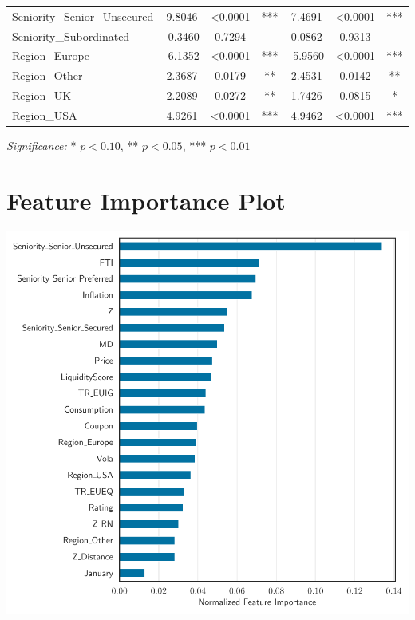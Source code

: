 \begin{center}
\begin{minipage}{\textwidth}
\begin{tabular}{lcccccc}
    Seniority\_Senior\_Unsecured & 9.8046 & <0.0001 & *** & 7.4691 & <0.0001 & *** \\
    Seniority\_Subordinated & -0.3460 & 0.7294 &  & 0.0862 & 0.9313 &  \\
    Region\_Europe & -6.1352 & <0.0001 & *** & -5.9560 & <0.0001 & *** \\
    Region\_Other & 2.3687 & 0.0179 & ** & 2.4531 & 0.0142 & ** \\
    Region\_UK & 2.2089 & 0.0272 & ** & 1.7426 & 0.0815 & * \\
    Region\_USA & 4.9261 & <0.0001 & *** & 4.9462 & <0.0001 & *** \\
    \bottomrule
    \end{tabular}
    \caption*{\textit{Significance:} * $p<0.10$, ** $p<0.05$, *** $p<0.01$}
    \label{tab:feature_t_statistics}
\end{minipage}
\end{center}

\section{Feature Importance Plot}

\vspace{1em}

\begin{center}
\begin{minipage}{\textwidth}
    \centering
    \includegraphics[width=\textwidth]{images/feature_importance.pdf}
    \label{fig:feature_importance}
\end{minipage}
\end{center}